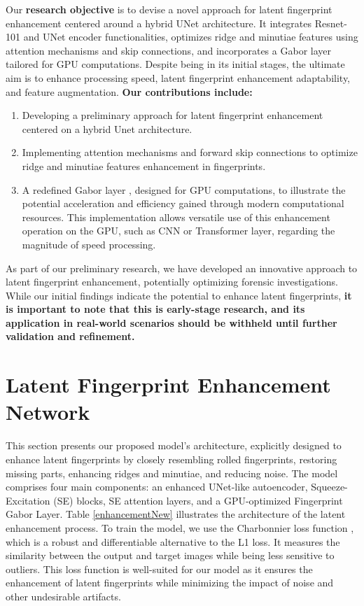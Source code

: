 \documentclass[twocolumn, switch]{article} %
\begin{document}
Our \textbf{research objective} is to devise a novel approach for latent fingerprint enhancement centered around a hybrid UNet \cite{ronneberger2015u} architecture. It integrates Resnet-101 \cite{DBLP:journals/corr/HeZRS15}
and UNet encoder functionalities, optimizes ridge and minutiae features using attention mechanisms and skip connections, and incorporates a Gabor layer tailored for GPU computations. Despite being in its initial stages, the ultimate aim is to enhance processing speed, latent fingerprint enhancement adaptability, and feature augmentation. \textbf{Our contributions include:} 
\begin{enumerate}[noitemsep] \item Developing a preliminary approach for latent fingerprint enhancement centered on a hybrid Unet architecture. \item Implementing attention mechanisms and forward skip connections to optimize ridge and minutiae features enhancement in fingerprints. \item A redefined Gabor layer \cite{hong1998fingerprint}, designed for GPU computations, to illustrate the potential acceleration and efficiency gained through modern computational resources. This implementation allows versatile use of this enhancement operation on the GPU, such as CNN or Transformer layer, regarding the magnitude of speed processing. \end{enumerate}

As part of our preliminary research, we have developed an innovative approach to latent fingerprint enhancement, potentially optimizing forensic investigations. While our initial findings indicate the potential to enhance latent fingerprints, \textbf{it is important to note that this is early-stage research, and its application in real-world scenarios should be withheld until further validation and refinement.}



\section{Latent Fingerprint Enhancement Network}

This section presents our proposed model's architecture, explicitly designed to enhance latent fingerprints by closely resembling rolled fingerprints, restoring missing parts, enhancing ridges and minutiae, and reducing noise. The model comprises four main components: an enhanced UNet-like autoencoder, Squeeze-Excitation (SE) blocks, SE attention layers, and a GPU-optimized Fingerprint Gabor Layer. Table \ref{enhancementNew} illustrates the architecture of the latent enhancement process. To train the model, we use the Charbonnier loss function \cite{charbonnier1994two}, which is a robust and differentiable alternative to the L1 loss. It measures the similarity between the output and target images while being less sensitive to outliers. This loss function is well-suited for our model as it ensures the enhancement of latent fingerprints while minimizing the impact of noise and other undesirable artifacts.
\end{document}
